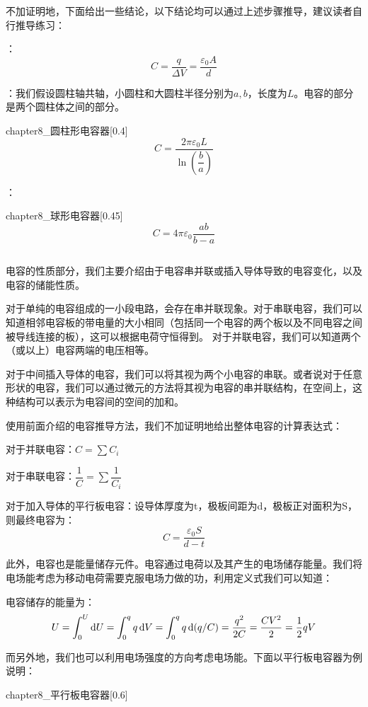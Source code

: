 不加证明地，下面给出一些结论，以下结论均可以通过上述步骤推导，建议读者自行推导练习：
\begin{Itemize}
    \item {}：
        \[C=\dfrac{q}{\Delta V}=\dfrac{\varepsilon_0 A}{d}\]
    \item {}：我们假设圆柱轴共轴，小圆柱和大圆柱半径分别为$a,b$，长度为$L$。电容的部分是两个圆柱体之间的部分。
    \begin{singlefigure}[圆柱形电容器]{chapter8_圆柱形电容器}[0.4]
        \[C=\dfrac{2\pi\varepsilon_0 L}{\ln(\dfrac{b}{a})}\]
    \end{singlefigure}
    \item {}：
    \begin{singlefigure}[球形电容器]{chapter8_球形电容器}[0.45]
        \[C=4\pi\varepsilon_0\dfrac{ab}{b-a}\]
    \end{singlefigure}
\end{Itemize}
\subsection[电容的性质]{}
电容的性质部分，我们主要介绍由于电容串并联或插入导体导致的电容变化，以及电容的储能性质。

对于单纯的电容组成的一小段电路，会存在串并联现象。对于串联电容，我们可以知道相邻电容板的带电量的大小相同（包括同一个电容的两个板以及不同电容之间被导线连接的板），这可以根据电荷守恒得到。
对于并联电容，我们可以知道两个（或以上）电容两端的电压相等。

对于中间插入导体的电容，我们可以将其视为两个小电容的串联。或者说对于任意形状的电容，我们可以通过微元的方法将其视为电容的串并联结构，在空间上，这种结构可以表示为电容间的空间的加和。

使用前面介绍的电容推导方法，我们不加证明地给出整体电容的计算表达式：
\begin{law}[电容的性质]
    对于并联电容：$C=\sum C_i$

    对于串联电容：$\dfrac{1}{C}=\sum\dfrac{1}{C_i}$

    对于加入导体的平行板电容：设导体厚度为t，极板间距为d，极板正对面积为S，则最终电容为：
    \[C=\dfrac{\varepsilon_0 S}{d-t}\]
\end{law}

此外，电容也是能量储存元件。电容通过电荷以及其产生的电场储存能量。我们将电场能考虑为移动电荷需要克服电场力做的功，利用定义式我们可以知道：
\begin{law}[电容的储能性质]
    电容储存的能量为：
    \[U=\int_0^U \dif{U}=\int_0^q q\dif{V}=\int_0^q q\dif{(q/C)}=\dfrac{q^2}{2C}=\dfrac{CV^2}{2}=\dfrac{1}{2}qV\]
\end{law}
而另外地，我们也可以利用电场强度的方向考虑电场能。下面以平行板电容器为例说明：
\begin{singlefigure}[平行板电容器]{chapter8_平行板电容器}[0.6]
\end{singlefigure}

